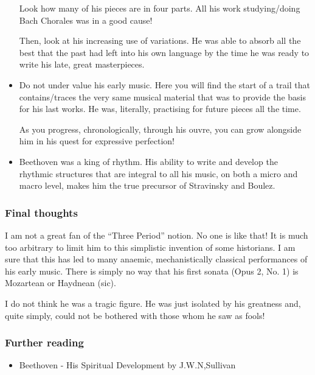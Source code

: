 \documentclass{article}
\begin{document}
\begin{itemize}
        Look how many of his pieces are in four parts.
        All his work studying/doing Bach Chorales was in a good cause!

        Then, look at his increasing use of variations.
        He was able to absorb all the best that the past had left into his own language by the time he was ready to write his late, great masterpieces.

    \item Do not under value his early music.
        Here you will find the start of a trail that contains/traces the very same musical material that was to provide the basis for his last works.
        He was, literally, practising for future pieces all the time.

        As you progress, chronologically, through his ouvre, you can grow alongside him in his quest for expressive perfection!

    \item Beethoven was a king of rhythm.
        His ability to write and develop the rhythmic structures that are integral to all his music, on both a micro and macro level, makes him the true precursor of Stravinsky and Boulez.
\end{itemize}

\subsubsection{Final thoughts}

I am not a great fan of the ``Three Period'' notion.
No one is like that!
It is much too arbitrary to limit him to this simplistic invention of some historians.
I am sure that this has led to many anaemic, mechanistically classical performances of his early music.
There is simply no way that his first sonata (Opus 2, No. 1) is Mozartean or Haydnean (sic).

I do not think he was a tragic figure.
He was just isolated by his greatness and, quite simply, could not be bothered with those whom he saw as fools!

\subsubsection{Further reading}

\begin{itemize}
    \item Beethoven - His Spiritual Development by J.W.N,Sullivan
\end{itemize}
\end{document}
